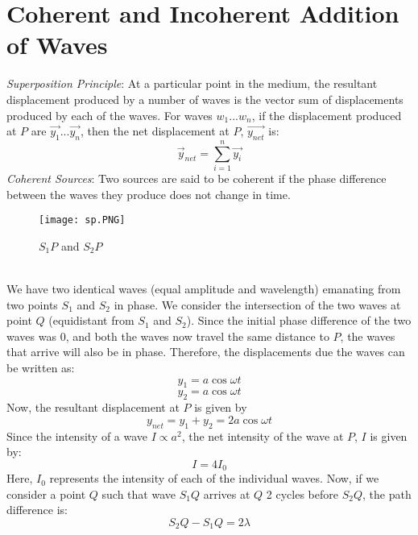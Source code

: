 \documentclass{article}
\begin{document}
\section{Coherent and Incoherent Addition of Waves}
\emph{Superposition Principle}: At a particular point in the medium, the resultant displacement produced by a number of waves is the vector sum of displacements produced by each of the waves. For waves $w_{1}...w_{n}$, if the displacement produced at $P$ are $\vec{y_{1}}...\vec{y_{n}}$, then the net displacement at $P$, $\vec{y_{net}}$ is:
\begin{equation*}
    \vec{y}_{net} = \sum_{i = 1}^{n} \vec{y_{i}}
\end{equation*}
\newpage
\emph{Coherent Sources}: Two sources are said to be coherent if the phase difference between the waves they produce does not change in time. 
\\ \newline
\begin{figure}[htp]
    \centering
    \texttt{[image: sp.PNG]}
    \caption{$S_{1}P$ and $S_{2}P$}
    \label{fig:galaxy}
\end{figure}\\
We have two identical waves (equal amplitude and wavelength) emanating from two points $S_{1}$ and $S_{2}$ in phase. We consider the intersection of the two waves at point $Q$ (equidistant from $S_1$ and $S_2$). Since the initial phase difference of the two waves was $0$, and both the waves now travel the same distance to $P$, the waves that arrive will also be in phase. Therefore, the displacements due the waves can be written as:
\begin{equation*}
    y_{1} = a\cos{\omega t}
\end{equation*}
\begin{equation*}
    y_{2} = a\cos{\omega t}
\end{equation*}
Now, the resultant displacement at $P$ is given by
\begin{equation*}
    y_{net} = y_{1} + y_{2} = 2a\cos{\omega t}
\end{equation*}
Since the intensity of a wave $I \propto a^{2}$, the net intensity of the wave at $P$, $I$ is given by:
\begin{equation*}
    I = 4I_{0}
\end{equation*}
Here, $I_{0}$ represents the intensity of each of the individual waves. Now, if we consider a point $Q$ such that wave $S_{1}Q$ arrives at $Q$ 2 cycles before $S_{2}Q$, the path difference is:
\begin{equation*}
    S_{2}Q - S_{1}Q = 2 \lambda
\end{equation*}
\end{document}
